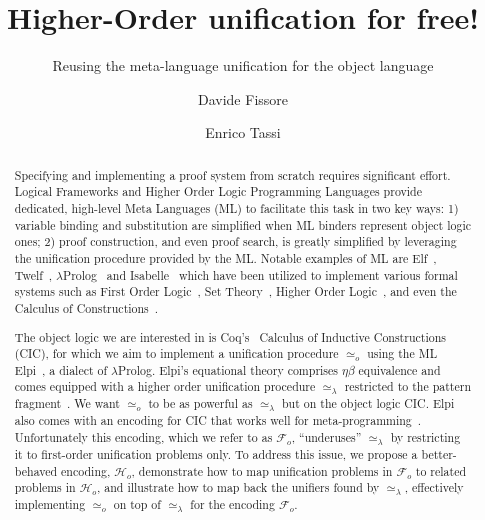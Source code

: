 \documentclass[sigconf,natbib=false,review]{acmart}
\newcommand{\UnifRel}{\ensuremath{\simeq}}
\newcommand{\Uo}{\ensuremath{\UnifRel_o}\xspace}
\newcommand{\Ue}{\ensuremath{\UnifRel_\lambda}\xspace}
\newcommand{\Fo}{\ensuremath{\mathcal{F}_{\!o}\xspace}} %
\newcommand{\Ho}{\ensuremath{\mathcal{H}_o}\xspace}
\begin{document}
\title{Higher-Order unification for free!}
\subtitle{Reusing the meta-language unification for the object language}

\author{Davide Fissore}

\author{Enrico Tassi}

\begin{abstract}
  Specifying and implementing a proof system from scratch requires significant effort.
  Logical Frameworks and Higher Order Logic Programming Languages provide
  dedicated, high-level Meta Languages (ML) to facilitate this task in two
  key ways: 1) variable binding and substitution are simplified when ML binders
  represent object logic ones; 2) proof construction, and even proof search, is
  greatly simplified by leveraging the unification procedure provided by the ML.
  Notable examples of ML are Elf~\cite{elf}, Twelf~\cite{twelf},
  $\lambda$Prolog~\cite{miller_nadathur_2012} and
  Isabelle~\cite{10.1007/978-3-540-71067-7_7}
  which have been utilized to implement various formal systems such as
  First Order Logic~\cite{felty88cade},
  Set Theory~\cite{10.1007/BF00881873},
  Higher Order Logic~\cite{books/sp/NipkowPW02}, and even the Calculus of
  Constructions~\cite{felty93lics}.

  The object logic we are interested in is Coq's~\cite{Coq-refman}
  Calculus of Inductive Constructions (CIC),
  for which we aim to implement a unification procedure \Uo using the ML
  Elpi~\cite{dunchev15lpar}, a dialect of $\lambda$Prolog.
  Elpi's equational theory comprises
  $\eta\beta$ equivalence and comes equipped with a
  higher order unification procedure \Ue restricted to the pattern
  fragment~\cite{miller92jsc}.
  We want \Uo to be as powerful as \Ue but on the object logic CIC.
  Elpi also comes with an encoding for CIC that works well
  for meta-programming~\cite{tassi:hal-01637063,tassi:hal-01897468,gregoire:hal-03800154,newtc}.
  Unfortunately this encoding, which we refer to as \Fo,
  ``underuses'' \Ue by restricting it to first-order unification problems only.
  To address this issue, we propose a better-behaved encoding, \Ho,
  demonstrate how to map unification problems in \Fo{}
  to related problems in \Ho, and illustrate
  how to map back the unifiers found by \Ue, effectively implementing
   \Uo on top of \Ue for the encoding \Fo.

\end{abstract}
\end{document}

